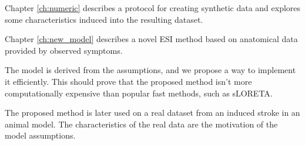 Chapter \ref{ch:numeric} describes a protocol for creating synthetic data and explores some characteristics induced into the resulting dataset.

Chapter \ref{ch:new_model} describes a novel ESI method based on anatomical data provided by observed symptoms.

The model is derived from the assumptions, and we propose a way to implement it efficiently.
%
This should prove that the proposed method isn't more computationally expensive than popular fast methods, such as sLORETA.

The proposed method is later used on a real dataset from an induced stroke in an animal model.
%
The characteristics of the real data are the motivation of the model assumptions.

